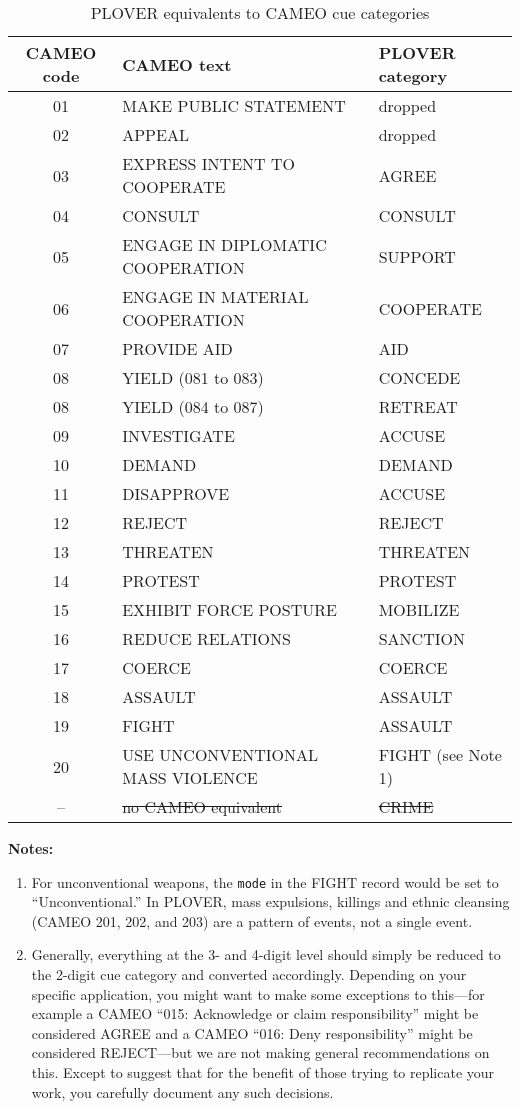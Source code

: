 \documentclass[11pt]{report}
\newcommand{\plcat}[1]{\textsf{#1}}
\begin{document}
\begin{table}[htp]
\caption{PLOVER equivalents to CAMEO cue categories}
\begin{center}
\begin{tabular}{|c|l|l|}
\hline
CAMEO code & CAMEO text & PLOVER category \\
\hline
01 & MAKE PUBLIC STATEMENT & dropped \\
02 & APPEAL & dropped \\
03 & EXPRESS INTENT TO COOPERATE & AGREE \\
04 & CONSULT & CONSULT \\
05 & ENGAGE IN DIPLOMATIC COOPERATION & SUPPORT \\
06 & ENGAGE IN MATERIAL COOPERATION & COOPERATE \\
07 & PROVIDE AID & AID \\
08 & YIELD (081 to 083) & CONCEDE \\
08 & YIELD (084 to 087) & RETREAT \\
09 & INVESTIGATE & ACCUSE \\
10 & DEMAND & DEMAND \\
11 & DISAPPROVE & ACCUSE \\
12 & REJECT & REJECT \\
13 & THREATEN & THREATEN \\
14 & PROTEST & PROTEST \\
15& EXHIBIT FORCE POSTURE & MOBILIZE \\
16 & REDUCE RELATIONS & SANCTION \\
17 & COERCE & COERCE \\
18 & ASSAULT & ASSAULT \\
19 & FIGHT & ASSAULT \\
20 & USE UNCONVENTIONAL MASS VIOLENCE & FIGHT (see Note 1) \\
-- & \sout{no CAMEO equivalent} & \sout{CRIME} \\
\hline

\end{tabular}
\end{center}
\label{tab:xlate}
\end{table}%

\noindent \textbf{Notes:}

\begin{enumerate}
\item For unconventional weapons, the  \texttt{mode} in the \plcat{FIGHT} record would be set to ``Unconventional.'' In PLOVER, mass expulsions, killings and ethnic cleansing (CAMEO 201, 202, and 203) are a pattern of events, not a single event.
\item Generally, everything at the 3- and 4-digit level should simply be reduced to the 2-digit cue category and converted accordingly. Depending on your specific application, you might want to make some exceptions to this---for example a CAMEO  ``015: Acknowledge or claim responsibility'' might be considered \plcat{AGREE} and a CAMEO ``016: Deny responsibility'' might be considered REJECT---but we are not making general recommendations on this. Except to suggest that for the benefit of those trying to replicate your work, you carefully document any such decisions.
\end{enumerate}
\end{document}
